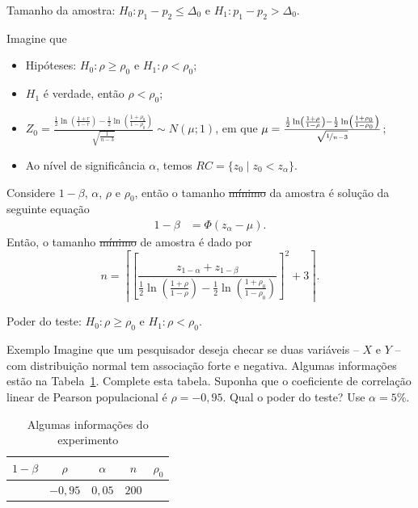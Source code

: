 \documentclass[9pt]{beamer}
\begin{document}
\begin{frame}{Tamanho da amostra: $H_0:p_1 - p_2 \leq \Delta_0$ e $H_1: p_1 - p_2 > \Delta_0$.}

\normalsize
Imagine que
\begin{itemize}
	\item Hipóteses: $H_0:\rho \geq \rho_0$ e $H_1: \rho < \rho_0$;
	\item $H_1$ é verdade, então $\rho < \rho_0$;
	\item $Z_0 = \frac{\frac{1}{2} \ln\left( \frac{1 + r}{1 - r} \right) - \frac{1}{2} \ln\left( \frac{1 + \rho_0}{1 - \rho_0} \right)}{\sqrt{\frac{1}{n-3}}} \sim N\left( \mu; 1 \right)$, em que $\mu = \frac{ \frac{1}{2} \ln\left( \frac{1 + \rho}{1 - \rho} \right) -\frac{1}{2} \ln\left( \frac{1 + \rho_0}{1 - \rho_0} \right)  }{\sqrt{\nicefrac{1}{n-3}}}$;
	\item Ao nível de significância $\alpha$, temos $RC = \{ z_0 \mid z_0 < z_{\alpha}   \}$.
\end{itemize}
\vfill

Considere $1-\beta$, $\alpha$, $\rho$ e $\rho_0$, então o tamanho \sout{mínimo} da amostra é solução da seguinte equação
\begin{align*}
1-\beta &= \Phi\left( z_{\alpha} - \mu \right).
\end{align*}
Então, o tamanho \sout{mínimo} de amostra é dado por
$$n = \left\lceil \left[\frac{z_{1-\alpha} + z_{1-\beta} }{ \frac{1}{2} \ln \left( \frac{1 + \rho}{1 - \rho} \right) - \frac{1}{2} \ln \left( \frac{1 + \rho_0}{1 - \rho_0} \right) }\right]^2 + 3 \right\rceil. $$
\normalsize

\end{frame}


\begin{frame}{Poder do teste: $H_0:\rho \geq \rho_0$ e $H_1: \rho < \rho_0$.}

\begin{block}{Exemplo}
	Imagine que um pesquisador deseja checar se duas variáveis -- $X$ e $Y$ --  com distribuição normal tem associação forte e negativa. Algumas informações estão na Tabela~\ref{tab:experimento-test-rho-power}. Complete esta tabela. Suponha que o coeficiente de correlação linear de Pearson populacional é $\rho=-0,95$. Qual o poder do teste? Use $\alpha=5\%$.
	
	\begin{table}[ht]
		\centering
		\begin{tabular}{c|c|c|c|c}
			\toprule[0.05cm]
			$1-\beta$ & $\rho$ & $\alpha$ & $n$ & $\rho_0$ \\
			\midrule
			 & $-0,95$ & $0,05$ & $200$  &   \\ \bottomrule[0.05cm]
		\end{tabular}
		\caption{Algumas informações do experimento} 
		\label{tab:experimento-test-rho-power}
	\end{table}
\end{block}


\end{frame}
\end{document}
